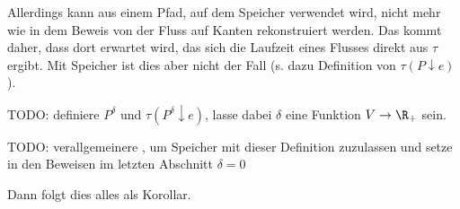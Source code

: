 Allerdings kann aus einem Pfad, auf dem Speicher verwendet wird, nicht mehr wie
in dem Beweis von  der Fluss auf Kanten rekonstruiert werden.
Das kommt daher, dass dort erwartet wird, das sich die Laufzeit eines Flusses
direkt aus $\tau$ ergibt. Mit Speicher ist dies aber nicht der Fall
(s. dazu Definition von $\tau(P \downarrow e)$).

TODO: definiere $P^\delta$ und $\tau(P^\delta \downarrow e)$, lasse dabei $\delta$
eine Funktion $V \to \R_+$ sein.

TODO: verallgemeinere , um Speicher mit dieser Definition zuzulassen
und setze in den Beweisen im letzten Abschnitt $\delta = 0$

Dann folgt dies alles als Korollar.

